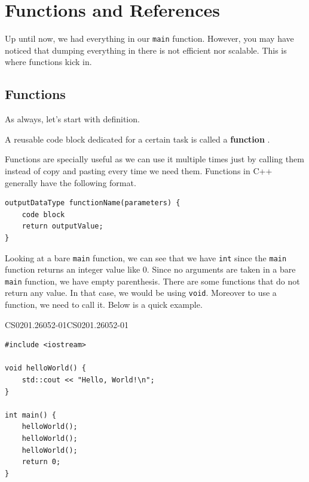 \documentclass[../../../main.tex]{subfiles}
\begin{document}
\section{Functions and References}

Up until now, we had everything in our \verb|main| function.
However, you may have noticed that dumping everything in there is
not efficient nor scalable. This is where functions kick in.

\subsection{Functions}

As always, let's start with definition.

\begin{definition}{}{}
A reusable code block dedicated for a certain task is called a
\textbf{function} \cite{CS02-5}.
\end{definition}

Functions are specially useful as we can use it multiple times just
by calling them instead of copy and pasting every time we need them.
Functions in C++ generally have the following format.

\begin{basicbox}
\begin{lstlisting}[style=cppstyle]
outputDataType functionName(parameters) {
    code block
    return outputValue;
}
\end{lstlisting}
\end{basicbox}

Looking at a bare \verb|main| function, we can see that we have
\verb|int| since the \verb|main| function returns an integer value
like $0$. Since no arguments are taken in a bare \verb|main| function,
we have empty parenthesis. There are some functions that do not
return any value. In that case, we would be using \verb|void|.
Moreover to use a function, we need to call it. Below is a quick
example.

\begin{cppbox}{CS0201.26052-01}{CS0201.26052-01}
\begin{lstlisting}[style=cppstyle]
#include <iostream>

void helloWorld() {
    std::cout << "Hello, World!\n";
}

int main() {
    helloWorld();
    helloWorld();
    helloWorld();
    return 0;
}
\end{lstlisting}
\end{cppbox}
\end{document}
